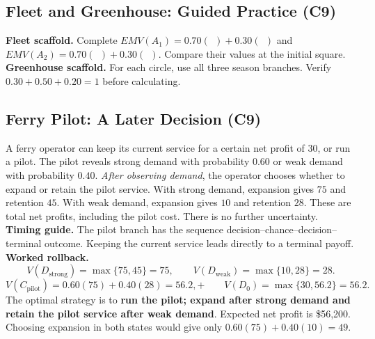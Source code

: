 \subsection{Fleet and Greenhouse: Guided Practice (C9)}\label{sec:solve-fleet}
\label{task:solve-fleet}
\textbf{Fleet scaffold.} Complete $EMV(A_1)=0.70(\ \ )+0.30(\ \ )$ and $EMV(A_2)=0.70(\ \ )+0.30(\ \ )$. Compare their values at the initial square.
\label{task:solve-greenhouse}
\textbf{Greenhouse scaffold.} For each circle, use all three season branches. Verify $0.30+0.50+0.20=1$ before calculating.

\subsection{Ferry Pilot: A Later Decision (C9)}\label{sec:pilot}
A ferry operator can keep its current service for a certain net profit of $30$, or run a pilot. The pilot reveals strong demand with probability $0.60$ or weak demand with probability $0.40$. \emph{After observing demand}, the operator chooses whether to expand or retain the pilot service. With strong demand, expansion gives $75$ and retention $45$. With weak demand, expansion gives $10$ and retention $28$. These are total net profits, including the pilot cost. There is no further uncertainty.
\label{task:pilot-tree}
\textbf{Timing guide.} The pilot branch has the sequence decision--chance--decision--terminal outcome. Keeping the current service leads directly to a terminal payoff.
\label{task:pilot-solve}
\textbf{Worked rollback.}
\[
V(D_{\mathrm{strong}})=\max\{75,45\}=75,\qquad
V(D_{\mathrm{weak}})=\max\{10,28\}=28.
\]
\[
V(C_{\mathrm{pilot}})=0.60(75)+0.40(28)=56.2,+\qquad V(D_0)=\max\{30,56.2\}=56.2.
\]
The optimal strategy is to \textbf{run the pilot; expand after strong demand and retain the pilot service after weak demand}. Expected net profit is \$56,200. Choosing expansion in both states would give only $0.60(75)+0.40(10)=49$.

